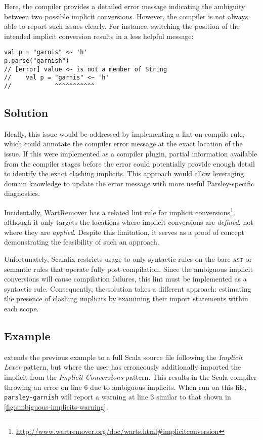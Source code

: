 \documentclass[../../main.tex]{subfiles}
\begin{document}
Here, the compiler provides a detailed error message indicating the ambiguity between two possible implicit conversions.
However, the compiler is not always able to report such issues clearly. For instance, switching the position of the intended implicit conversion results in a less helpful message:
\begin{verbatim}
val p = "garnis" <~ 'h'
p.parse("garnish")
// [error] value <~ is not a member of String
//    val p = "garnis" <~ 'h'
//            ^^^^^^^^^^^
\end{verbatim}

\subsection*{Solution}
Ideally, this issue would be addressed by implementing a lint-on-compile rule, which could annotate the compiler error message at the exact location of the issue.
If this were implemented as a compiler plugin, partial information available from the compiler stages before the error could potentially provide enough detail to identify the exact clashing implicits.
This approach would allow leveraging domain knowledge to update the error message with more useful Parsley-specific diagnostics.

Incidentally, WartRemover has a related lint rule for implicit conversions\footnote{\url{http://www.wartremover.org/doc/warts.html#implicitconversion}},
although it only targets the locations where implicit conversions are \emph{defined}, not where they are \emph{applied}.
Despite this limitation, it serves as a proof of concept demonstrating the feasibility of such an approach.

Unfortunately, Scalafix restricts usage to only syntactic rules on the bare \textsc{ast} or semantic rules that operate fully post-compilation.
Since the ambiguous implicit conversions will cause compilation failures, this lint must be implemented as a syntactic rule.
Consequently, the solution takes a different approach: estimating the presence of clashing implicits by examining their import statements within each scope.

\subsection*{Example}
 extends the previous example to a full Scala source file following the \emph{Implicit Lexer} pattern,
but where the user has erroneously additionally imported the \scala{stringLift} implicit from the \emph{Implicit Conversions} pattern.
This results in the Scala compiler throwing an error on line 6 due to ambiguous implicits.
When run on this file, \texttt{parsley-garnish} will report a warning at line 3 similar to that shown in \cref{fig:ambiguous-implicits-warning}.
\end{document}

